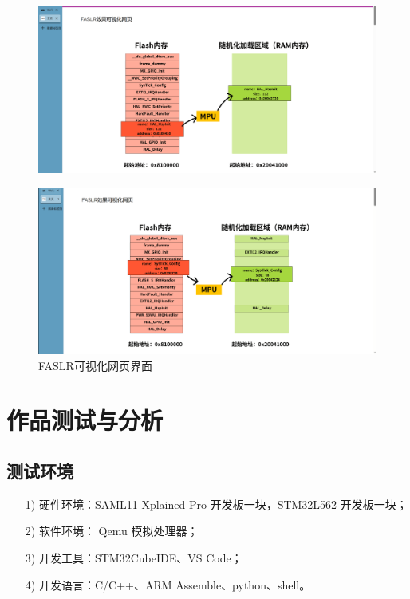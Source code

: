 \documentclass[UTF8,12pt,a4paper,twoside]{ctexart}
\numberwithin{figure}{section}
\begin{document}
\begin{figure}[H]
    \centering
    \includegraphics[scale=0.15]{graph/web1.png}
\end{figure}
\begin{figure}[H]
    \centering
    \includegraphics[scale=0.15]{graph/web2.png}
    \caption{FASLR可视化网页界面}
    \label{web}
\end{figure}


\section{作品测试与分析}
\subsection{测试环境}
\begin{itemize}
    \item[1)] 硬件环境：SAML11 Xplained Pro 开发板一块，STM32L562 开发板一块；
    \item[2)] 软件环境： Qemu 模拟处理器；
    \item[3)] 开发工具：STM32CubeIDE、VS Code；
    \item[4)] 开发语言：C/C++、ARM Assemble、python、shell。
\end{itemize}
\end{document}
